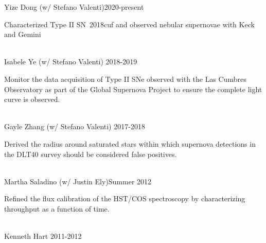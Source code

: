 \documentclass[10pt]{cv}
\begin{document}
\begin{llist}
\vspace{-0.1in}  
Yize Dong (w/ Stefano Valenti)\hfill 2020-present\\
\begin{minipage}[l]{0.7\textwidth}\vspace{0.15cm}
Characterized Type II SN~2018cuf and observed nebular supernovae with Keck and Gemini\\
\end{minipage}\vspace{0.15cm}
\\
Isabele Ye (w/ Stefano Valenti) \hfill 2018-2019\\
\begin{minipage}[l]{0.7\textwidth}\vspace{0.15cm}
Monitor the data acquisition of Type II SNe observed with the Las Cumbres Observatory as part of the Global Supernova Project to ensure the complete light curve is observed.\\
\end{minipage}\vspace{0.15cm}
\\
Gayle Zhang (w/ Stefano Valenti) \hfill 2017-2018\\
\begin{minipage}[l]{0.7\textwidth}\vspace{0.15cm}
Derived the radius around saturated stars within which supernova detections in the DLT40 survey should be considered false positives.\\
\end{minipage}\vspace{0.15cm}
\\
Martha Saladino (w/ Justin Ely)\hfill Summer 2012\\
\begin{minipage}[l]{0.7\textwidth}\vspace{0.15cm}
Refined the flux calibration of the HST/COS spectroscopy by characterizing throughput as a function of time.\\
\end{minipage}\vspace{0.15cm}
\\
Kenneth Hart \hfill 2011-2012\\

\end{llist}
\end{document}
